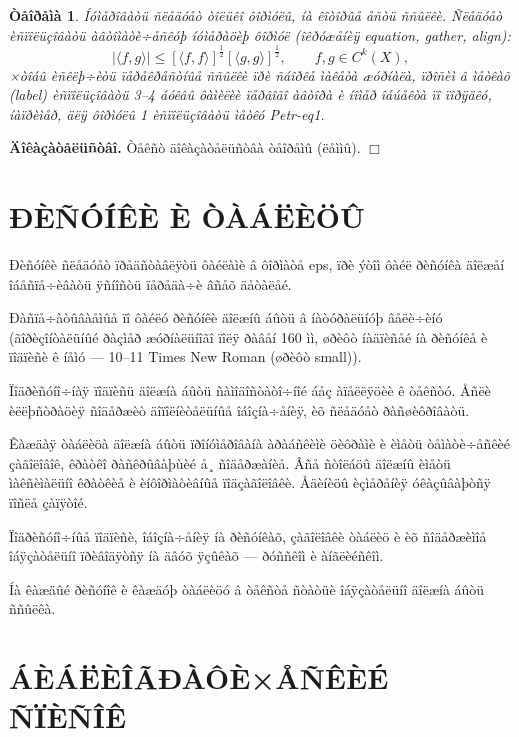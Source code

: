 \documentclass[12pt]{book}
\theoremstyle{plain}
\newtheorem{theorem}{\indent Òåîðåìà}
\theoremstyle{remark}
\theoremstyle{plain}
\theoremstyle{definition}
\renewenvironment{proof}{\indent\textbf{Äîêàçàòåëüñòâî. }}{\hfill$\Box$}
\begin{document}
\begin{theorem}\label{Petr_thm1}  Íóìåðîâàòü ñëåäóåò òîëüêî ôîðìóëû, íà êîòîðûå åñòü ññûëêè. Ñëåäóåò
èñïîëüçîâàòü àâòîìàòè÷åñêóþ íóìåðàöèþ ôîðìóë (\textrm{îêðóæåíèÿ equation, gather, align}):
\begin{equation}\label{Petr_eq1}
\vert \langle f,g\rangle\vert \leq [\langle f,f\rangle]^{\frac 12}
[\langle g,g\rangle]^{\frac 12},\qquad f,g\in C^k(X),
\end{equation}
×òîáû èñêëþ÷èòü ïåðåêðåñòíûå ññûëêè ïðè ñáîðêå ìàêåòà æóðíàëà,
ïðîñèì â ìåòêàõ (label) èñïîëüçîâàòü 3--4 áóêâû ôàìèëèè ïåðâîãî
àâòîðà è íîìåð îáúåêòà ïî ïîðÿäêó, íàïðèìåð, äëÿ ôîðìóëû 1
èñïîëüçîâàòü ìåòêó Petr-eq1.
\end{theorem}

\begin{proof}
Òåêñò äîêàçàòåëüñòâà òåîðåìû (ëåììû).
\end{proof}

\section{ÐÈÑÓÍÊÈ È ÒÀÁËÈÖÛ}\label{Petr_sec2}

Ðèñóíêè ñëåäóåò ïðåäñòàâëÿòü ôàéëàìè â ôîðìàòå eps, ïðè ýòîì ôàéë ðèñóíêà äîëæåí îáåñïå÷èâàòü
ÿñíîñòü ïåðåäà÷è âñåõ äåòàëåé.

Ðàñïå÷àòûâàåìûå ïî ôàéëó ðèñóíêè äîëæíû áûòü â íàòóðàëüíóþ
âåëè÷èíó (ãîðèçîíòàëüíûé ðàçìåð æóðíàëüíîãî ïîëÿ ðàâåí 160 ìì,
øðèôò íàäïèñåé íà ðèñóíêå è ïîäïèñè ê íåìó --- 10--11 Times New
Roman (øðèôò small)).

Ïîäðèñóíî÷íàÿ ïîäïèñü äîëæíà áûòü ñàìîäîñòàòî÷íîé áåç àïåëëÿöèè ê
òåêñòó. Åñëè èëëþñòðàöèÿ ñîäåðæèò äîïîëíèòåëüíûå îáîçíà÷åíèÿ, èõ
ñëåäóåò ðàñøèôðîâàòü.

Êàæäàÿ òàáëèöà äîëæíà áûòü ïðîíóìåðîâàíà àðàáñêèìè öèôðàìè è èìåòü òåìàòè÷åñêèé çàãîëîâîê, êðàòêî
ðàñêðûâàþùèé å¸ ñîäåðæàíèå. Âñå ñòîëáöû äîëæíû èìåòü ìàêñèìàëüíî êðàòêèå è èíôîðìàòèâíûå
ïîäçàãîëîâêè. Åäèíèöû èçìåðåíèÿ óêàçûâàþòñÿ ïîñëå çàïÿòîé.

Ïîäðèñóíî÷íûå ïîäïèñè, îáîçíà÷åíèÿ íà ðèñóíêàõ, çàãîëîâêè òàáëèö è
èõ ñîäåðæèìîå îáÿçàòåëüíî ïðèâîäÿòñÿ íà äâóõ ÿçûêàõ --- ðóññêîì è
àíãëèéñêîì.

Íà êàæäûé ðèñóíîê è êàæäóþ òàáëèöó â òåêñòå ñòàòüè îáÿçàòåëüíî äîëæíà áûòü ññûëêà.

\section{ÁÈÁËÈÎÃÐÀÔÈ×ÅÑÊÈÉ ÑÏÈÑÎÊ}\label{Petr_sec3}
\end{document}

